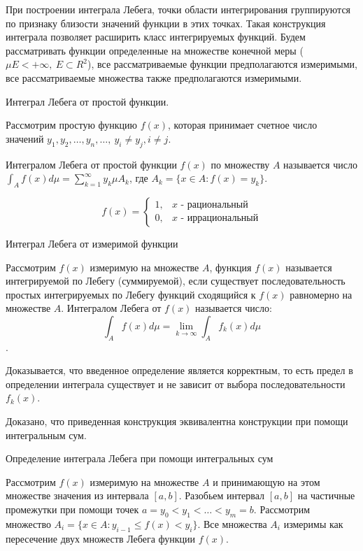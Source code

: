\documentclass[14pt]{extarticle}
\theoremstyle{definition}
\theoremstyle{remark}
\renewcommand{\[}{\begin{dmath*}[compact]}
\renewcommand{\]}{\end{dmath*}}
\newcommand{\sep}{ , \ \allowbreak }
\begin{document}
При построении интеграла Лебега, точки области интегрирования группируются по признаку близости значений функции в этих точках. Такая конструкция интеграла позволяет расширить класс интегрируемых функций. Будем рассматривать функции определенные на множестве конечной меры ($\mu E < +\infty \sep E \subset R^2$), все рассматриваемые функции предполагаются измеримыми, все рассматриваемые множества также предполагаются измеримыми.

Интеграл Лебега от простой функции.

Рассмотрим простую функцию $f(x)$, которая принимает счетное число значений $y_1, y_2, \dots, y_n, \dots \sep y_i \neq y_j, i\neq j$.

Интегралом Лебега от простой функции $f(x)$ по множеству $A$ называется число $\int_A f(x) d\mu = \sum_{k=1}^\infty y_k\mu A_k$, где $A_k=\{x\in A:f(x)=y_k\}$.

\[f(x) = \begin{cases} 1, & x\text{ - рациональный} \\ 0, & x\text{ - иррациональный} \end{cases}\]

Интеграл Лебега от измеримой функции

Рассмотрим $f(x)$ измеримую на множестве $A$, функция $f(x)$ называется интегрируемой по Лебегу (суммируемой), если существует последовательность простых интегрируемых по Лебегу функций сходящийся к $f(x)$ равномерно на множестве $A$. Интегралом Лебега от $f(x)$ называется число:
\[\int_A f(x) d\mu = \lim_{k \to \infty} \int_A f_k(x) d\mu\].

Доказывается, что введенное определение является корректным, то есть предел в определении интеграла существует и не зависит от выбора последовательности $f_k(x)$.

Доказано, что приведенная конструкция эквивалентна конструкции при помощи интегральным сум.

Определение интеграла Лебега при помощи интегральных сум

Рассмотрим $f(x)$ измеримую на множестве $A$ и принимающую на этом множестве значения из интервала $[a,b]$. Разобьем интервал $[a,b]$ на частичные промежутки при помощи точек $a=y_0 < y_1 < \dots < y_m = b$. Рассмотрим множество $A_i = \{x \in A: y_{i-1} \leq f(x) < y_i\}$. Все множества $A_i$ измеримы как пересечение двух множеств Лебега функции $f(x)$.
\end{document}

